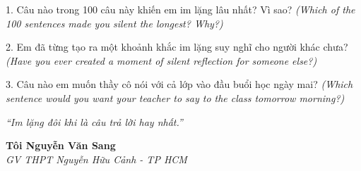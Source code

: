 \begin{tuhocnhanh}
1. Câu nào trong 100 câu này khiến em im lặng lâu nhất? Vì sao? \textit{(Which of the 100 sentences made you silent the longest? Why?)}

2. Em đã từng tạo ra một khoảnh khắc im lặng suy nghĩ cho người khác chưa? \textit{(Have you ever created a moment of silent reflection for someone else?)}

3. Câu nào em muốn thầy cô nói với cả lớp vào đầu buổi học ngày mai? \textit{(Which sentence would you want your teacher to say to the class tomorrow morning?)}
\end{tuhocnhanh}

\begin{center}
\textit{\color{silver}``Im lặng đôi khi là câu trả lời hay nhất.''}
\end{center}

\begin{flushright}
\textbf{Tôi Nguyễn Văn Sang}\\
\textit{GV THPT Nguyễn Hữu Cảnh - TP HCM}
\end{flushright}

\ngancach
